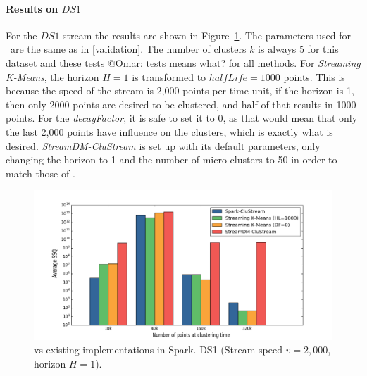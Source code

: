 \paragraph{Results on $DS1$}
For the $DS1$ stream the results are shown in Figure~\ref{fig:comparison2000}.
The parameters used for \our~are the same as in \ref{validation}. The number of clusters $k$ is always 5 for this dataset and these \color{red}tests @Omar: tests means what?\color{black} for all methods.
For \textit{Streaming K-Means}, the horizon $H=1$ is transformed to $halfLife=1000$ points. This is because the speed of the stream is 2,000 points per time unit, if the horizon is 1, then only 2000 points are desired to be clustered, and half of that results in 1000 points. 
For the \textit{decayFactor}, it is safe to set it to 0, as that would mean that only the last 2,000 points have influence on the clusters, which is exactly what is desired.
\textit{StreamDM-CluStream} is set up with its default parameters, only changing the horizon to 1 and the number of micro-clusters to 50 in order to match those of \our.

\begin{figure}[h]
 \centering
 \includegraphics[scale=0.3]{./styles/comparison2000.png}
 \caption{\our vs existing implementations in Spark. DS1 (Stream speed $v = 2,000$, horizon $H=1$).}
 \label{fig:comparison2000}
\end{figure}

